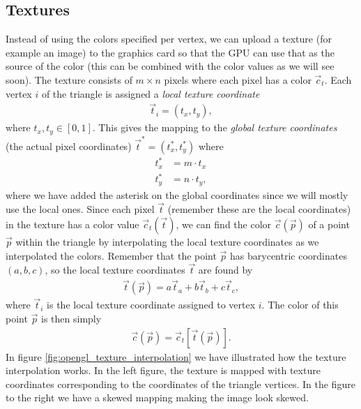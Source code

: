 \subsection{Textures}
\label{sec:opengl_texture_interpolation}
Instead of using the colors specified per vertex, we can upload a texture (for example an image) to the graphics card so that the GPU can use that as the source of the color (this can be combined with the color values as we will see soon). The texture consists of $m\times n$ pixels where each pixel has a color $\vec c_t$. Each vertex $i$ of the triangle is assigned a \textit{local texture coordinate} 
\begin{align}
	\vec t_i = (t_x, t_y),
\end{align}
where $t_x, t_y \in [0,1]$. This gives the mapping to the \textit{global texture coordinates} (the actual pixel coordinates) $\vec t^* = (t_x^*, t_y^*)$ where 
\begin{align}
	\nonumber
	t_x^* &= m\cdot t_x\\
	t_y^* &= n\cdot t_y,
\end{align}
where we have added the asterisk on the global coordinates since we will mostly use the local ones. Since each pixel $\vec t$ (remember these are the local coordinates) in the texture has a color value $\vec c_t(\vec t)$, we can find the color $\vec c(\vec p)$ of a point $\vec p$ within the triangle by interpolating the local texture coordinates as we interpolated the colors. Remember that the point $\vec p$ has barycentric coordinates $(a,b,c)$, so the local texture coordinates $\vec t$ are found by
\begin{align}
	\vec t(\vec p) =  a\vec t_a + b\vec t_b + c\vec t_c,
\end{align}
where $\vec t_i$ is the local texture coordinate assigned to vertex $i$. The color of this point $\vec p$ is then simply
\begin{align}
	\vec c(\vec p) = \vec c_t[\vec t(\vec p)].
\end{align}
In figure \ref{fig:opengl_texture_interpolation} we have illustrated how the texture interpolation works. In the left figure, the texture is mapped with  texture coordinates corresponding to the coordinates of the triangle vertices. In the figure to the right we have a skewed mapping making the image look skewed.
